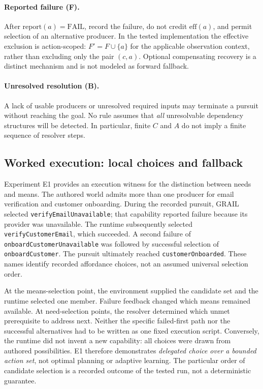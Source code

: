 \documentclass[11pt]{article}
\begin{document}
\paragraph{Reported failure (F).} After $\mathrm{report}(a)=\mathrm{FAIL}$, record the failure, do not credit $\mathrm{eff}(a)$, and permit selection of an alternative producer. In the tested implementation the effective exclusion is action-scoped: $F'=F\cup\{a\}$ for the applicable observation context, rather than excluding only the pair $(c,a)$. Optional compensating recovery is a distinct mechanism and is not modeled as forward fallback.

\paragraph{Unresolved resolution (B).} A lack of usable producers or unresolved required inputs may terminate a pursuit without reaching the goal. No rule assumes that \emph{all} unresolvable dependency structures will be detected. In particular, finite $C$ and $A$ do not imply a finite sequence of resolver steps.

\subsection{Worked execution: local choices and fallback}
Experiment E1 provides an execution witness for the distinction between needs and means. The authored world admits more than one producer for email verification and customer onboarding. During the recorded pursuit, GRAIL selected \texttt{verifyEmailUnavailable}; that capability reported failure because its provider was unavailable. The runtime subsequently selected \texttt{verifyCustomerEmail}, which succeeded. A second failure of \texttt{onboardCustomerUnavailable} was followed by successful selection of \texttt{onboardCustomer}. The pursuit ultimately reached \texttt{customerOnboarded}. These names identify recorded affordance choices, not an assumed universal selection order.

At the means-selection point, the environment supplied the candidate set and the runtime selected one member. Failure feedback changed which means remained available. At need-selection points, the resolver determined which unmet prerequisite to address next. Neither the specific failed-first path nor the successful alternatives had to be written as one fixed execution script. Conversely, the runtime did not invent a new capability: all choices were drawn from authored possibilities. E1 therefore demonstrates \emph{delegated choice over a bounded action set}, not optimal planning or adaptive learning. The particular order of candidate selection is a recorded outcome of the tested run, not a deterministic guarantee.
\end{document}
